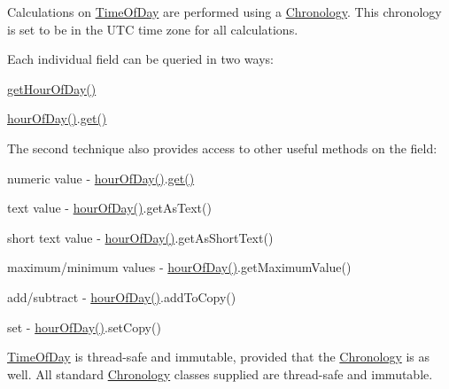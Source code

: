 Calculations on \hyperlink{classorg_1_1joda_1_1time_1_1_time_of_day}{Time\-Of\-Day} are performed using a \hyperlink{classorg_1_1joda_1_1time_1_1_chronology}{Chronology}. This chronology is set to be in the U\-T\-C time zone for all calculations. 

Each individual field can be queried in two ways\-: 
\begin{DoxyItemize}
\item {\ttfamily \hyperlink{classorg_1_1joda_1_1time_1_1_time_of_day_aabdbae467ace0ffc9df089179eef9cda}{get\-Hour\-Of\-Day()}} 
\item {\ttfamily \hyperlink{classorg_1_1joda_1_1time_1_1_time_of_day_a8dd140a8112cba92d90d8bcb00a1764b}{hour\-Of\-Day()}.\hyperlink{interfaceorg_1_1joda_1_1time_1_1_readable_partial_a5844c779ac1ebd81281466fe2d23547a}{get()}} 
\end{DoxyItemize}The second technique also provides access to other useful methods on the field\-: 
\begin{DoxyItemize}
\item numeric value -\/ {\ttfamily \hyperlink{classorg_1_1joda_1_1time_1_1_time_of_day_a8dd140a8112cba92d90d8bcb00a1764b}{hour\-Of\-Day()}.\hyperlink{interfaceorg_1_1joda_1_1time_1_1_readable_partial_a5844c779ac1ebd81281466fe2d23547a}{get()}} 
\item text value -\/ {\ttfamily \hyperlink{classorg_1_1joda_1_1time_1_1_time_of_day_a8dd140a8112cba92d90d8bcb00a1764b}{hour\-Of\-Day()}.get\-As\-Text()} 
\item short text value -\/ {\ttfamily \hyperlink{classorg_1_1joda_1_1time_1_1_time_of_day_a8dd140a8112cba92d90d8bcb00a1764b}{hour\-Of\-Day()}.get\-As\-Short\-Text()} 
\item maximum/minimum values -\/ {\ttfamily \hyperlink{classorg_1_1joda_1_1time_1_1_time_of_day_a8dd140a8112cba92d90d8bcb00a1764b}{hour\-Of\-Day()}.get\-Maximum\-Value()} 
\item add/subtract -\/ {\ttfamily \hyperlink{classorg_1_1joda_1_1time_1_1_time_of_day_a8dd140a8112cba92d90d8bcb00a1764b}{hour\-Of\-Day()}.add\-To\-Copy()} 
\item set -\/ {\ttfamily \hyperlink{classorg_1_1joda_1_1time_1_1_time_of_day_a8dd140a8112cba92d90d8bcb00a1764b}{hour\-Of\-Day()}.set\-Copy()} 
\end{DoxyItemize}

\hyperlink{classorg_1_1joda_1_1time_1_1_time_of_day}{Time\-Of\-Day} is thread-\/safe and immutable, provided that the \hyperlink{classorg_1_1joda_1_1time_1_1_chronology}{Chronology} is as well. All standard \hyperlink{classorg_1_1joda_1_1time_1_1_chronology}{Chronology} classes supplied are thread-\/safe and immutable.

